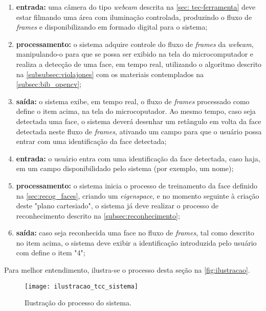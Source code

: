 \begin{enumerate}
	\item \textbf{entrada:} uma câmera do tipo \textit{webcam} descrita na \autoref{sec: tec-ferramenta} deve estar filmando uma área com iluminação controlada, produzindo o fluxo de \textit{frames} e disponibilizando em formado digital para o sistema;
	
	\item \textbf{processamento:} o sistema adquire controle do fluxo de \textit{frames} da \textit{webcam}, manipulando-o para que se possa ser exibido na tela do microcomputador e realiza a detecção de uma face, em tempo real, utilizando o algoritmo descrito na \autoref{subsubsec:violajones} com os materiais contemplados na \autoref{subsec:bib_opencv};
	
	\item \textbf{saída:} o sistema exibe, em tempo real, o fluxo de \textit{frames} processado como define o item acima, na tela do microcoputador. Ao mesmo tempo, caso seja detectada uma face, o sistema deverá desenhar um retângulo em volta da face detectada neste fluxo de \textit{frames}, ativando um campo para que o usuário possa entrar com uma identificação da face detectada;
	
	\item \textbf{entrada:} o usuário entra com uma identificação da face detectada, caso haja, em um campo disponibilidado pelo sistema (por exemplo, um nome);
	
	\item \textbf{processamento:} o sistema inicia o processo de treinamento da face definido na \autoref{sec:recog_faces}, criando um \textit{eigenspace}, e no momento seguinte à criação deste "plano cartesiado", o sistema já deve realizar o processo de reconhecimento descrito na \autoref{subsec:reconhecimento};
	
	\item \textbf{saída:} caso seja reconhecida uma face no fluxo de \textit{frames}, tal como descrito no item acima, o sistema deve exibir a identificação introduzida pelo usuário com define o item "4";
\end{enumerate}

Para melhor entendimento, ilustra-se o processo desta seção na \autoref{fig:ilustracao}.

\begin{figure}[h]
	\centering
	\texttt{[image: ilustracao\_tcc\_sistema]}
	\caption{Ilustração do processo do sistema.}
	\label{fig:ilustracao}
\end{figure}



